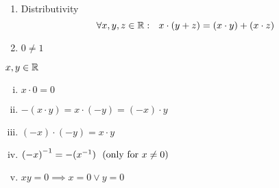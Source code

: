 \documentclass[../../script.tex]{subfiles}
\begin{document}
\begin{defi}\leavevmode
\begin{enumerate}[label=R\arabic*:]
	\item Distributivity
	\[
		\forall x, y, z \in \mathbb{R}: ~~ x\cdot(y + z) = (x \cdot y) + (x \cdot z)
	\]
	\item $0 \ne 1$
\end{enumerate}
\end{defi}

\begin{thm}
$x, y \in \mathbb{R}$

\begin{enumerate}[(i)]
	\item $x \cdot 0 = 0$
	\item $-(x \cdot y) = x \cdot (-y) = (-x) \cdot y$
	\item $(-x) \cdot (-y) = x \cdot y$
	\item ${(-x)}^{-1} = -({x}^{-1}) ~~(\text{only for } x \ne 0)$
	\item $xy = 0 \implies x = 0 \vee y = 0$
\end{enumerate}
\end{thm}
\end{document}
